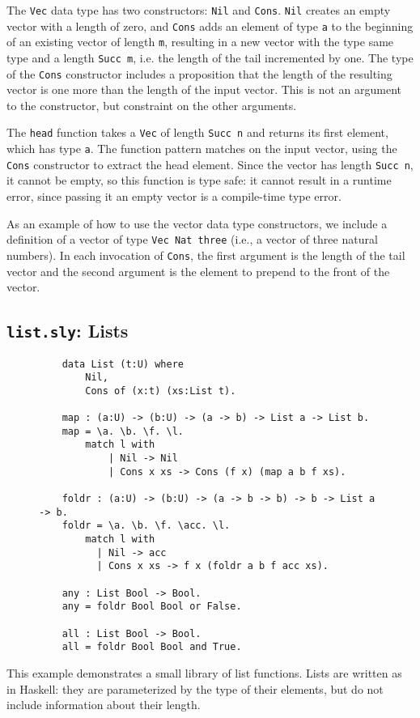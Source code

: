 The \texttt{Vec} data type has two constructors: \texttt{Nil} and \texttt{Cons}. 
\texttt{Nil} creates an empty vector with a length of zero, and \texttt{Cons}
adds an element of type \texttt{a} to the beginning of an existing vector of
length \texttt{m}, resulting in a new vector with the type same type and a
length \texttt{Succ m}, i.e. the length of the tail incremented by one. 
The type of the \texttt{Cons} constructor includes a proposition that the length of
the resulting vector is one more than the length of the input vector. This is
not an argument to the constructor, but constraint on the other arguments.

The \texttt{head} function takes a \texttt{Vec} of length \texttt{Succ n} and
returns its first element, which has type \texttt{a}. 
The function pattern matches on the input vector, using the \texttt{Cons} constructor to extract the head element.
Since the vector has length \texttt{Succ n}, it cannot be empty, so this
function is type safe: it cannot result in a runtime error, since passing it an
empty vector is a compile-time type error.

As an example of how to use the vector data type constructors, we include a
definition of a vector of type \texttt{Vec Nat three} (i.e., a vector of
three natural numbers). In each invocation of \texttt{Cons}, the first argument
is the length of the tail vector and the second argument is the element to
prepend to the front of the vector.
\newpage

\subsection{\texttt{list.sly}: Lists}
\begin{figure}[h!]
\begin{lstlisting}
    data List (t:U) where
        Nil,
        Cons of (x:t) (xs:List t).

    map : (a:U) -> (b:U) -> (a -> b) -> List a -> List b.
    map = \a. \b. \f. \l.
        match l with
            | Nil -> Nil
            | Cons x xs -> Cons (f x) (map a b f xs).

    foldr : (a:U) -> (b:U) -> (a -> b -> b) -> b -> List a -> b.
    foldr = \a. \b. \f. \acc. \l.
        match l with
          | Nil -> acc
          | Cons x xs -> f x (foldr a b f acc xs).

    any : List Bool -> Bool.
    any = foldr Bool Bool or False.

    all : List Bool -> Bool.
    all = foldr Bool Bool and True.
\end{lstlisting}
\end{figure}
This example demonstrates a small library of list functions. Lists are written
as in Haskell: they are parameterized by the type of their elements, but do not
include information about their length.

